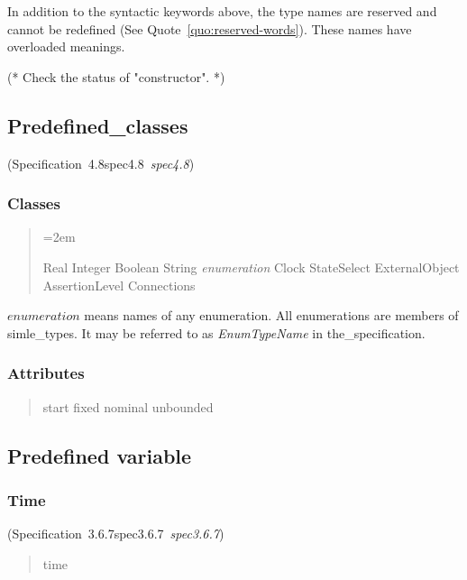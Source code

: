 \documentclass[10pt,b5paper]{article}
\def\specrefx#1#2{Specification~#1\ifx\relax#2\relax{}\else~{\it{}#2}\fi}
\def\specref#1{\specrefx{#1}{\csname spec#1\endcsname}}
\begin{document}
\noindent
In addition to the syntactic keywords above, the type names are
reserved and cannot be redefined (See Quote~\ref{quo:reserved-words}).
These names have overloaded meanings.

(* Check the status of "constructor". *)


\subsection{Predefined_classes}

(\specref{4.8}\/)

\subsubsection*{Classes}

\begin{quote}
\spaceskip=2em
\sloppy{}

Real
Integer
Boolean
String
{\it{}enumeration}
Clock
StateSelect
ExternalObject
AssertionLevel
Connections

\end{quote}

\noindent $\mathit{enumeration}$ means names of any enumeration.  All
enumerations are members of simle_types.  It may be referred to as
{\it{}EnumTypeName\/} in the_specification.

\subsubsection*{Attributes}

\begin{quote}\widespacing

start
fixed
nominal
unbounded

\end{quote}


\subsection{Predefined variable}

\subsubsection*{Time}

(\specref{3.6.7}\/)

\begin{quote}\widespacing
time
\end{quote}
\end{document}
